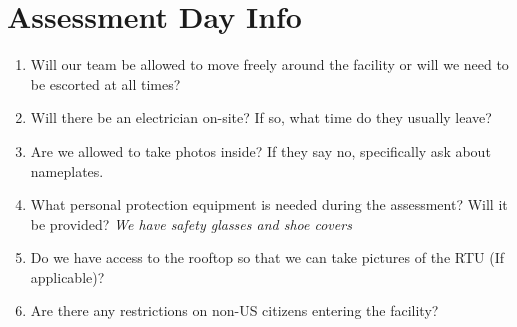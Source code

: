 \documentclass[./main.tex]{subfiles}
\begin{document}
\section*{Assessment Day Info}

\begin{enumerate}[leftmargin=*]
\item Will our team be allowed to move freely around the facility or will we need to be escorted at all times? 

\vspace{\answerspace}

\item Will there be an electrician on-site? If so, what time do they usually leave? 

\vspace{\answerspace}

\item Are we allowed to take photos inside? If they say no, specifically ask about nameplates. 

\vspace{\answerspace}

\item What personal protection equipment is needed during the assessment? Will it be provided? \emph{We have safety glasses and shoe covers}

\vspace{\answerspace}

\item Do we have access to the rooftop so that we can take pictures of the RTU (If applicable)?

\vspace{\answerspace}

\item Are there any restrictions on non-US citizens entering the facility? 
\end{enumerate}


\end{document}
